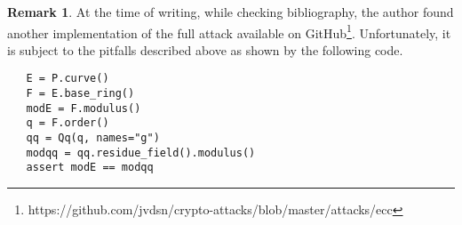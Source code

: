 \documentclass[10pt]{article}
\theoremstyle{definition}
\newtheorem{remark}{Remark}
\begin{document}
\begin{remark}
At the time of writing, while checking bibliography, the author found another implementation of the full attack available on GitHub\footnote{https://github.com/jvdsn/crypto-attacks/blob/master/attacks/ecc}.
Unfortunately, it is subject to the pitfalls described above as shown by the following code.
\begin{verbatim}
   E = P.curve()
   F = E.base_ring()
   modE = F.modulus()
   q = F.order()
   qq = Qq(q, names="g")
   modqq = qq.residue_field().modulus()
   assert modE == modqq
\end{verbatim}

\end{remark}




\end{document}
